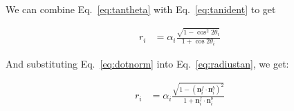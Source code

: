 \documentclass{article}
\begin{document}
We can combine Eq.~\eqref{eq:tantheta} with Eq.~\eqref{eq:tanident} to get

\begin{align}
  \label{eq:radiustan}
  r_{i} &= \alpha_i\frac{\sqrt{1-\cos^{2} 2\theta_i}}{1+\cos 2\theta_i}
\end{align}

And substituting Eq.~\eqref{eq:dotnorm} into Eq.~\eqref{eq:radiustan}, we get:

\begin{align}
  \label{eq:radius-alpha}
  r_{i} &= \alpha_i\frac{\sqrt{1-\left(\mathbf{n}^f_i\cdot \mathbf{n}^b_i\right)^{2}}}{1+\mathbf{n}^f_i\cdot \mathbf{n}^b_i}
\end{align}
\end{document}
